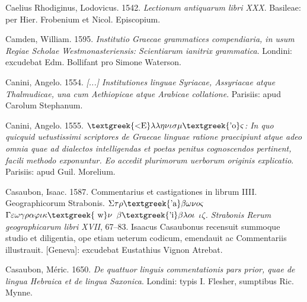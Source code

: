 \begin{styleStandard}
Caelius Rhodiginus, Lodovicus. 1542. \textit{Lectionum antiquarum libri XXX}. Basileae: per Hier. Frobenium et Nicol. Episcopium.
\end{styleStandard}

\begin{styleStandard}
Camden, William. 1595. \textit{Institutio Graecae grammatices compendiaria, in usum Regiae Scholae Westmonasteriensis: Scientiarum ianitrix grammatica}. Londini: excudebat Edm. Bollifant pro Simone Waterson.
\end{styleStandard}

\begin{styleStandard}
Canini, Angelo. 1554. \textit{[...] Institutiones linguae Syriacae, Assyriacae atque Thalmudicae, una cum Aethiopicae atque Arabicae collatione}. Parisiis: apud Carolum Stephanum.
\end{styleStandard}

\begin{styleStandard}
Canini, Angelo. 1555. \textit{$\text{\textgreek{<E}}\lambda \lambda \eta \nu \iota \sigma \mu \text{\textgreek{'o}}\varsigma $: In quo quicquid uetustissimi scriptores de Graecae linguae ratione praecipiunt atque adeo omnia quae ad dialectos intelligendas et poetas penitus cognoscendos pertinent, facili methodo exponuntur. Eo accedit plurimorum uerborum originis explicatio}. Parisiis: apud Guil. Morelium.
\end{styleStandard}

\begin{styleStandard}
Casaubon, Isaac. 1587. Commentarius et castigationes in librum IIII. Geographicorum Strabonis. \textit{$\Sigma \tau \rho \text{\textgreek{'a}}\beta \omega \nu o\varsigma $ $\Gamma \varepsilon \omega \gamma \rho \alpha \varphi \iota \kappa \text{\textgreek{~w}}\nu $ $\beta \text{\textgreek{'i}}\beta \lambda o\iota $ $\iota \zeta $. {\textbar} Strabonis Rerum geographicarum libri XVII}, 67–83. Isaacus Casaubonus recensuit summoque studio et diligentia, ope etiam ueterum codicum, emendauit ac Commentariis illustrauit. [Geneva]: excudebat Eustathius Vignon Atrebat.
\end{styleStandard}

\begin{styleStandard}
Casaubon, Méric. 1650. \textit{De quattuor linguis commentationis pars prior, quae de lingua Hebraica et de lingua Saxonica}. Londini: typis I. Flesher, sumptibus Ric. Mynne.
\end{styleStandard}

